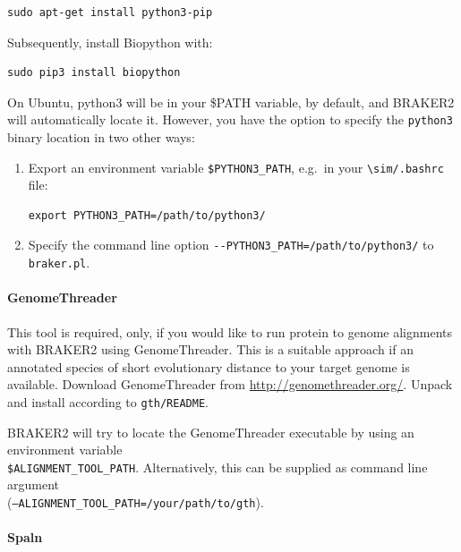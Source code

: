 \documentclass[]{article}
\let\oldparagraph\paragraph
\renewcommand{\paragraph}[1]{\oldparagraph{#1}\mbox{}}
\begin{document}
\begin{verbatim}
sudo apt-get install python3-pip
\end{verbatim}

Subsequently, install Biopython with:

\begin{verbatim}
sudo pip3 install biopython
\end{verbatim}

On Ubuntu, python3 will be in your \$PATH variable, by default, and
BRAKER2 will automatically locate it. However, you have the option to
specify the \texttt{python3} binary location in two other ways:

\begin{enumerate}
\def\labelenumi{\arabic{enumi}.}
\item
  Export an environment variable \texttt{\$PYTHON3\_PATH}, e.g.~in your
  \texttt{\textbackslash{}sim/.bashrc} file:

\begin{verbatim}
export PYTHON3_PATH=/path/to/python3/
\end{verbatim}
\item
  Specify the command line option
  \texttt{-\/-PYTHON3\_PATH=/path/to/python3/} to \texttt{braker.pl}.
\end{enumerate}

\paragraph{GenomeThreader}\label{genomethreader}

This tool is required, only, if you would like to run protein to genome
alignments with BRAKER2 using GenomeThreader. This is a suitable
approach if an annotated species of short evolutionary distance to your
target genome is available. Download GenomeThreader from
\url{http://genomethreader.org/}. Unpack and install according to
\texttt{gth/README}.

BRAKER2 will try to locate the GenomeThreader executable by using an
environment variable\\
\texttt{\$ALIGNMENT\_TOOL\_PATH}. Alternatively, this can be supplied as
command line argument\\
(\texttt{–ALIGNMENT\_TOOL\_PATH=/your/path/to/gth}).

\paragraph{Spaln}\label{spaln}
\end{document}
